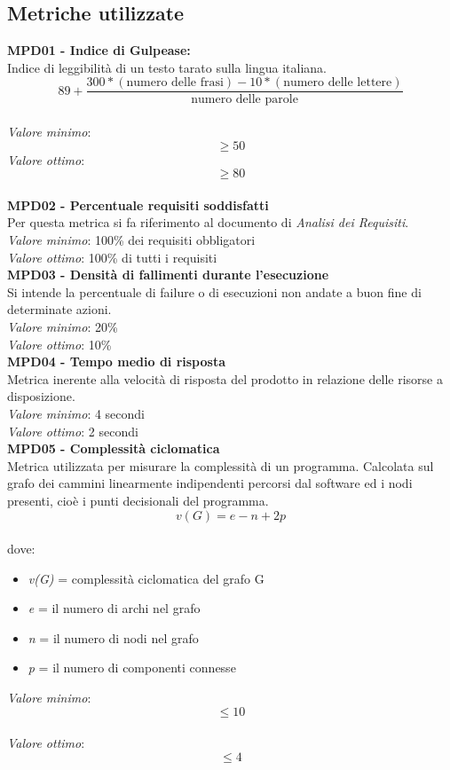\subsection{Metriche utilizzate}
\textbf{MPD01 - Indice di Gulpease:}\\
Indice di leggibilità di un testo tarato sulla lingua italiana.
\begin{equation}
89+\frac{300*(\text{numero delle frasi})-10*(\text{numero delle lettere})}{\text{numero delle parole}}
\end{equation}\\
\textit{Valore minimo}:$$ \geq 50 $$ 
\textit{Valore ottimo}:$$ \geq 80 $$\\

\noindent\textbf{MPD02 - Percentuale requisiti soddisfatti}\\
Per questa metrica si fa riferimento al documento di \textit{Analisi dei Requisiti}.\\
\textit{Valore minimo}: 100\% dei requisiti obbligatori\\
\textit{Valore ottimo}: 100\% di tutti i requisiti\\

\noindent\textbf{MPD03 - Densità di fallimenti durante l'esecuzione}\\
Si intende la percentuale di failure o di esecuzioni non andate a buon fine di determinate azioni.\\
\textit{Valore minimo}: 20\%\\
\textit{Valore ottimo}: 10\%\\

\noindent\textbf{MPD04 - Tempo medio di risposta}\\
Metrica inerente alla velocità di risposta del prodotto in relazione delle risorse a disposizione.\\
\textit{Valore minimo}: 4 secondi\\
\textit{Valore ottimo}: 2 secondi\\

\noindent\textbf{MPD05 - Complessità ciclomatica}\\
Metrica utilizzata per misurare la complessità di un programma. Calcolata sul grafo dei cammini linearmente indipendenti percorsi dal software ed i nodi presenti, cioè i punti decisionali del programma.\\
\begin{equation}
v(G) = e - n + 2p
\end{equation}\\
dove:
\begin{itemize}
	\item \textit{v(G)} = complessità ciclomatica del grafo G
	\item \textit{e} = il numero di archi nel grafo
	\item \textit{n} = il numero di nodi nel grafo
	\item \textit{p} = il numero di componenti connesse
\end{itemize}
\textit{Valore minimo}:$$ \leq 10 $$\\
\textit{Valore ottimo}:$$ \leq 4 $$\\

